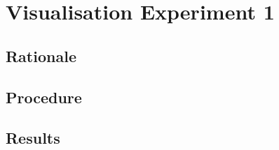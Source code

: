 
\chapter{Visualisation Experiment 1}
\label{cha:experimentone}

\section{Rationale}
\label{sec:experimentonerationale}

\section{Procedure}
\label{sec:experiemntoneprocedure}

\section{Results}
\label{sec:experiemntoneresults}

